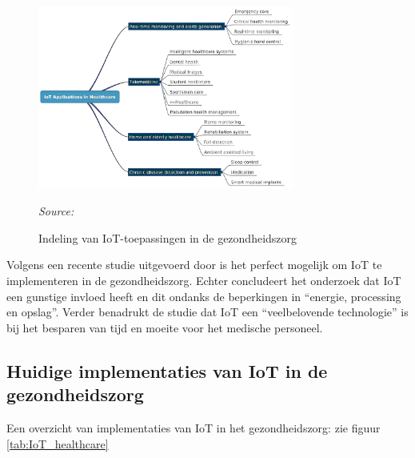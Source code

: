 \begin{figure}[h]
    \centering
    \includegraphics[width=0.75\textwidth]{img/bp/iot-healthcare (1).png}
    \caption{Indeling van IoT-toepassingen in de gezondheidszorg}
    \label{fig:Figuur10}
    \textit{Source: \autocite{Naresh2020}}
\end{figure}

Volgens een recente studie uitgevoerd door \autocite{Singh2023} is het perfect mogelijk om IoT te implementeren in de gezondheidszorg. Echter concludeert het onderzoek dat IoT een gunstige invloed heeft en dit ondanks de beperkingen in “energie, processing en opslag”. Verder benadrukt de studie dat IoT een “veelbelovende technologie” is bij het besparen van tijd en moeite voor het medische personeel. 

\subsection{Huidige implementaties van IoT in de gezondheidszorg}
Een overzicht van implementaties van IoT in het gezondheidszorg: zie figuur \ref{tab:IoT_healthcare}

